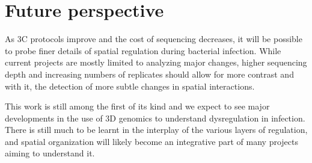 
\chapter{Future perspective} %

\label{ch:03-03} %

As 3C protocols improve and the cost of sequencing decreases, it will be possible to probe finer details of spatial regulation during bacterial infection. While current projects are mostly limited to analyzing major changes, higher sequencing depth and increasing numbers of replicates should allow for more contrast and with it, the detection of more subtle changes in spatial interactions.

This work is still among the first of its kind and we expect to see major developments in the use of 3D genomics to understand dysregulation in infection. There is still much to be learnt in the interplay of the various layers of regulation, and spatial organization will likely become an integrative part of many projects aiming to understand it.

